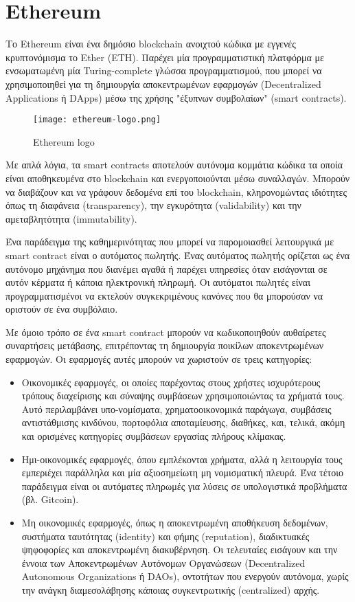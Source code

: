 \section{Ethereum}

Το Ethereum είναι ένα δημόσιο blockchain ανοιχτού κώδικα με εγγενές κρυπτονόμισμα το Ether (ETH). Παρέχει μία προγραμματιστική πλατφόρμα με ενσωματωμένη μία Turing-complete γλώσσα προγραμματισμού, που μπορεί να χρησιμοποιηθεί για τη δημιουργία αποκεντρωμένων εφαρμογών (Decentralized Applications ή DApps) μέσω της χρήσης "έξυπνων συμβολαίων" (smart contracts).\cite{ethereum}

\begin{figure}[H]
	\centering
	\texttt{[image: ethereum-logo.png]}
	\caption{Ethereum logo}
\end{figure}

Με απλά λόγια, τα smart contracts αποτελούν αυτόνομα κομμάτια κώδικα τα οποία είναι αποθηκευμένα στο blockchain και ενεργοποιούνται μέσω συναλλαγών. Μπορούν να διαβάζουν και να γράφουν δεδομένα επί του blockchain, κληρονομώντας ιδιότητες όπως τη διαφάνεια (transparency), την εγκυρότητα (validability) και την αμεταβλητότητα (immutability).

Ένα παράδειγμα της καθημερινότητας που μπορεί να παρομοιασθεί λειτουργικά με smart contract είναι ο αυτόματος πωλητής\cite{ethereum-smart-contracts}. Ένας αυτόματος πωλητής ορίζεται ως ένα αυτόνομο μηχάνημα που διανέμει αγαθά ή παρέχει υπηρεσίες όταν εισάγονται σε αυτόν κέρματα ή κάποια ηλεκτρονική πληρωμή. Οι αυτόματοι πωλητές είναι προγραμματισμένοι να εκτελούν συγκεκριμένους κανόνες που θα μπορούσαν να οριστούν σε ένα συμβόλαιο.

Με όμοιο τρόπο σε ένα smart contract μπορούν να κωδικοποιηθούν αυθαίρετες συναρτήσεις μετάβασης, επιτρέποντας τη δημιουργία ποικίλων αποκεντρωμένων εφαρμογών. Οι εφαρμογές αυτές μπορούν να χωριστούν σε τρεις κατηγορίες:
\begin{itemize}
	\item Οικονομικές εφαρμογές, οι οποίες παρέχοντας στους χρήστες ισχυρότερους τρόπους διαχείρισης και σύναψης συμβάσεων χρησιμοποιώντας τα χρήματά τους. Αυτό περιλαμβάνει υπο-νομίσματα, χρηματοοικονομικά παράγωγα, συμβάσεις αντιστάθμισης κινδύνου, πορτοφόλια αποταμίευσης, διαθήκες, και, τελικά, ακόμη και ορισμένες κατηγορίες συμβάσεων εργασίας πλήρους κλίμακας.
	
	\item Ημι-οικονομικές εφαρμογές, όπου εμπλέκονται χρήματα, αλλά η λειτουργία τους εμπεριέχει παράλληλα και  μία αξιοσημείωτη μη νομισματική πλευρά. Ένα τέτοιο παράδειγμα είναι οι αυτόματες πληρωμές για λύσεις σε υπολογιστικά προβλήματα (βλ. Gitcoin).
	
	\item Μη οικονομικές εφαρμογές, όπως η αποκεντρωμένη αποθήκευση δεδομένων, συστήματα ταυτότητας (identity) και φήμης (reputation), διαδικτυακές ψηφοφορίες και αποκεντρωμένη διακυβέρνηση. Οι τελευταίες εισάγουν και την έννοια των Αποκεντρωμένων Αυτόνομων Οργανώσεων (Decentralized Autonomous Organizations ή DAOs), οντοτήτων που ενεργούν αυτόνομα, χωρίς την ανάγκη διαμεσολάβησης κάποιας συγκεντρωτικής (centralized) αρχής.
\end{itemize}\cite{ethereum}

